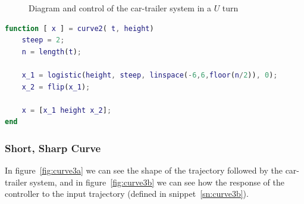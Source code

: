 \begin{figure}[H]
	\centering
	\hspace{0.5cm}%
	\caption{Diagram and control of the car-trailer system in a $U$ turn}
\end{figure}
\begin{lstlisting}[language=matlab, label=sn:curve2, caption=Function used to simulate a $U$ turn]
function [ x ] = curve2( t, height)
	steep = 2;
	n = length(t);

	x_1 = logistic(height, steep, linspace(-6,6,floor(n/2)), 0);
	x_2 = flip(x_1);

	x = [x_1 height x_2];
end
\end{lstlisting}

\subsubsection*{Short, Sharp Curve}
In figure~\ref{fig:curve3a} we can see the shape of the trajectory followed by the car-trailer system, and in figure~\ref{fig:curve3b} we can see how the response of the controller to the input trajectory (defined in snippet~\ref{sn:curve3b}).

